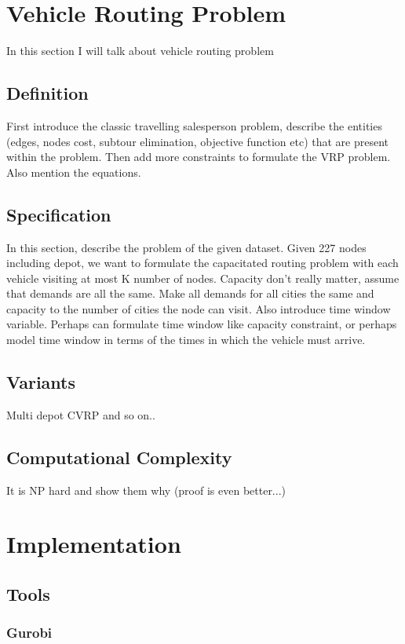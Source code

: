 \documentclass[a4paper, 12pt]{report}
\begin{document}
\chapter{Vehicle Routing Problem}
In this section I will talk about vehicle routing problem
\section{Definition}
First introduce the classic travelling salesperson problem, describe the entities (edges, nodes cost, subtour
elimination, objective function etc) that are present within the problem. Then add more constraints to formulate
the VRP problem. Also mention the equations.

\section{Specification}
In this section, describe the problem of the given dataset. Given 227 nodes including depot, we want to formulate
the capacitated routing problem with each vehicle visiting at most K number of nodes. Capacity don’t really matter,
 assume that demands are all the same. Make all demands for all cities the same and capacity to the number of
 cities the node can visit. Also introduce time window variable. Perhaps can formulate time window like
 capacity constraint, or perhaps model time window in terms of the times in which the vehicle must arrive.

\section{Variants}
Multi depot CVRP and so on..

\section{Computational Complexity}
It is NP hard and show them why (proof is even better...)


\chapter{Implementation}

\section{Tools}
\subsection{Gurobi}
\end{document}
